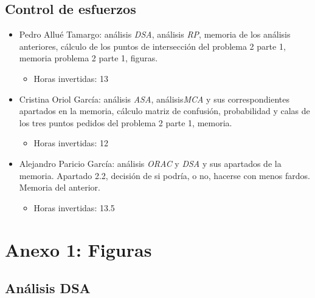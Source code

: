 \documentclass{article}
\begin{document}
\subsection{Control de esfuerzos}
\begin{itemize}
    \item Pedro Allué Tamargo: análisis \textit{DSA}, análisis \textit{RP}, memoria de los análisis anteriores, cálculo de los puntos de intersección del problema 2 parte 1, memoria problema 2 parte 1, figuras.
        \begin{itemize}
            \item Horas invertidas: 13
        \end{itemize}
    \item Cristina Oriol García: análisis \textit{ASA}, análisis\textit{MCA} y sus correspondientes apartados en la memoria, cálculo matriz de confusión, probabilidad y calas de los tres puntos pedidos del problema 2 parte 1, memoria. 
        \begin{itemize}
            \item Horas invertidas: 12
        \end{itemize}
    \item Alejandro Paricio García: análisis \textit{ORAC} y \textit{DSA} y sus apartados de la memoria. Apartado 2.2, decisión de si podría, o no, hacerse con menos fardos. Memoria del anterior.
        \begin{itemize}
            \item Horas invertidas: 13.5
        \end{itemize}
\end{itemize}

\newpage
\section{Anexo 1: Figuras}

\subsection{Análisis DSA}
\end{document}
